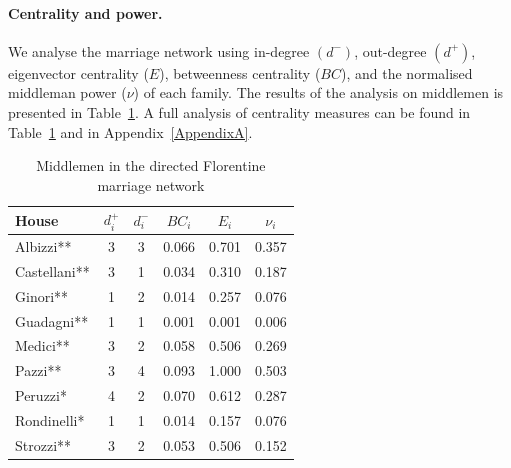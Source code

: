 \documentclass[11pt,fleqn]{article}
\begin{document}
\paragraph{Centrality and power.}

We analyse the marriage network using in-degree $\left(d^-\right)$, out-degree $\left(d^+\right)$, \citet{Bonacich1987} eigenvector centrality ($E$), betweenness centrality ($BC$), and the normalised middleman power ($\nu$) of each family. The results of the analysis on middlemen is presented in Table~\ref{tabFlorence}. A full analysis of centrality measures can be found in Table~\ref{tabFlorence} and in Appendix~\ref{AppendixA}.

\begin{table}
\begin{center}
\begin{tabular}{|l|ccccc|}
\toprule
House 	& $d^+_i$ & $d^-_i$ & $BC_i$    & $E_i$   & $\nu_i$  \\
\midrule
Albizzi** & 3 & 3 						 & 0.066 	 & 0.701   & 0.357 	  \\
Castellani**  & 3 & 1 						 & 0.034 	 & 0.310   & 0.187 	  \\
Ginori** & 1 & 2 						 & 0.014 	 & 0.257   & 0.076    \\
Guadagni** & 1 & 1 						 & 0.001 	 & 0.001   & 0.006 	  \\
Medici** & 3 & 2 						 & 0.058 	 & 0.506   & 0.269 	  \\
Pazzi**  & 3 & 4 						 & 0.093 	 & 1.000   & 0.503    \\
Peruzzi*  & 4 & 2 						 & 0.070 	 & 0.612   & 0.287    \\
Rondinelli*  & 1 & 1 						 & 0.014 	 & 0.157   & 0.076    \\
Strozzi** & 3 & 2 						 & 0.053 	 & 0.506   & 0.152    \\ 
\bottomrule
\end{tabular}
\caption{Middlemen in the directed Florentine marriage network}
\label{tabFlorence}
\end{center}
\end{table}
\end{document}
